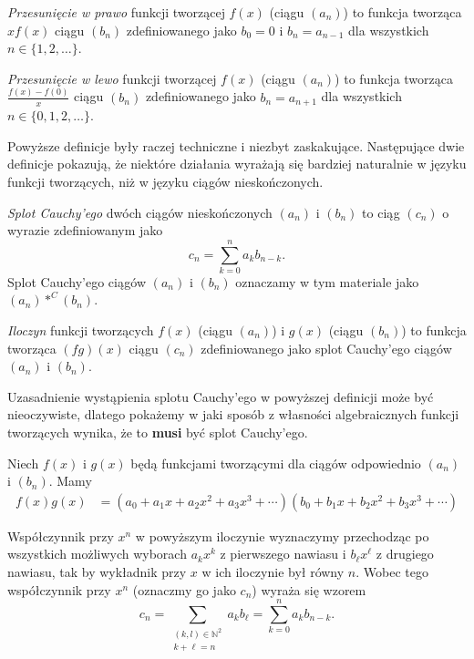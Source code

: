 \documentclass[shortabstract]{imthesis}
\begin{document}
\begin{definition}
    \emph{Przesunięcie w prawo} funkcji tworzącej $f(x)$ (ciągu $(a_n)$) to funkcja tworząca $xf(x)$ ciągu $(b_n)$ zdefiniowanego jako $b_0 = 0$ i $b_n = a_{n-1}$ dla wszystkich $n \in \{1, 2, \ldots\}$.
\end{definition}

\begin{definition}
    \emph{Przesunięcie w lewo} funkcji tworzącej $f(x)$ (ciągu $(a_n)$) to funkcja tworząca $\frac{f(x)-f(0)}{x}$ ciągu $(b_n)$ zdefiniowanego jako $b_n = a_{n+1}$ dla wszystkich $n \in \{0, 1, 2, \ldots\}$.
\end{definition}

Powyższe definicje były raczej techniczne i niezbyt zaskakujące. Następujące dwie definicje pokazują, że niektóre działania wyrażają się bardziej naturalnie w języku funkcji tworzących, niż w języku ciągów nieskończonych.

\begin{definition}
    \emph{Splot Cauchy'ego} dwóch ciągów nieskończonych $(a_n)$ i $(b_n)$ to ciąg $(c_n)$ o wyrazie zdefiniowanym jako
    $$
    c_n = \sum_{k=0}^n a_k b_{n-k}.
    $$
    Splot Cauchy'ego ciągów $(a_n)$ i $(b_n)$ oznaczamy w tym materiale jako $(a_n) *^C (b_n)$.
\end{definition}

\begin{definition}
    \emph{Iloczyn} funkcji tworzących $f(x)$ (ciągu $(a_n)$) i $g(x)$ (ciągu $(b_n)$) to funkcja tworząca $(fg)(x)$ ciągu $(c_n)$ zdefiniowanego jako splot Cauchy'ego ciągów $(a_n)$ i $(b_n)$.
\end{definition}

Uzasadnienie wystąpienia splotu Cauchy'ego w powyższej definicji może być nieoczywiste, dlatego pokażemy w jaki sposób z własności algebraicznych funkcji tworzących wynika, że to \textbf{musi} być splot Cauchy'ego. 

Niech $f(x)$ i $g(x)$ będą funkcjami tworzącymi dla ciągów odpowiednio $(a_n)$ i $(b_n)$. Mamy
\begin{align*}
    f(x)g(x) &= (a_0 + a_1x + a_2x^2 + a_3x^3 + \cdots)(b_0 + b_1x + b_2x^2 + b_3x^3 + \cdots)
\end{align*}

Współczynnik przy $x^n$ w powyższym iloczynie wyznaczymy przechodząc po wszystkich możliwych wyborach $a_kx^k$ z pierwszego nawiasu i $b_\ell x^\ell$ z drugiego nawiasu, tak by wykładnik przy $x$ w ich iloczynie był równy $n$. Wobec tego współczynnik przy $x^n$ (oznaczmy go jako $c_n$) wyraża się wzorem
$$
c_n = \sum_{\substack{(k, l) \in \mathbb{N}^2 \\ k + \ell = n}} a_k b_\ell = \sum_{k=0}^n a_k b_{n-k}.
$$
\end{document}
